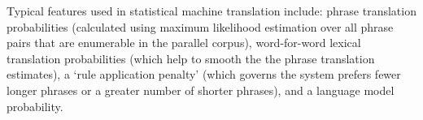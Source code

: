 \documentclass[11pt]{article}
\newcommand{\mnote}[1]{\marginpar{%
  \vskip-\baselineskip
  \raggedright\footnotesize
  \itshape\hrule\smallskip\footnotesize{#1}\par\smallskip\hrule}}
\begin{document}
Typical features used in statistical machine translation include: phrase translation probabilities (calculated using maximum likelihood estimation over all phrase pairs that are enumerable in the parallel corpus), word-for-word lexical translation probabilities (which help to smooth the the phrase translation estimates), a `rule application penalty' (which governs the system prefers fewer longer phrases or a greater number of shorter phrases), and a language model probability.


  
  

\end{document}

